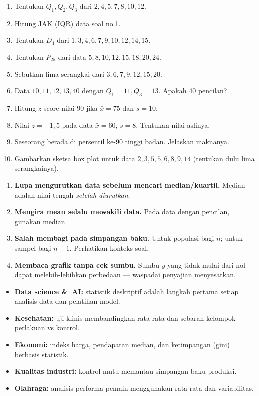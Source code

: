 \documentclass[11pt,a4paper]{report}
\theoremstyle{gaya}
\begin{document}
\begin{latihan}
\begin{enumerate}[leftmargin=*]
  \item Tentukan $Q_1,Q_2,Q_3$ dari $2,4,5,7,8,10,12$.
  \item Hitung JAK (IQR) data soal no.1.
  \item Tentukan $D_4$ dari $1,3,4,6,7,9,10,12,14,15$.
  \item Tentukan $P_{25}$ dari data $5,8,10,12,15,18,20,24$.
  \item Sebutkan lima serangkai dari $3,6,7,9,12,15,20$.
  \item Data $10,11,12,13,40$ dengan $Q_1=11,Q_3=13$. Apakah $40$ pencilan?
  \item Hitung $z$-score nilai $90$ jika $\bar x=75$ dan $s=10$.
  \item Nilai $z=-1{,}5$ pada data $\bar x=60$, $s=8$. Tentukan nilai aslinya.
  \item Seseorang berada di persentil ke-$90$ tinggi badan. Jelaskan maknanya.
  \item Gambarkan sketsa box plot untuk data $2,3,5,5,6,8,9,14$ (tentukan dulu lima serangkainya).
\end{enumerate}
\end{latihan}

\begin{kesalahan}
\begin{enumerate}[leftmargin=*,topsep=2pt]
  \item \textbf{Lupa mengurutkan data sebelum mencari median/kuartil.} Median adalah nilai tengah \emph{setelah diurutkan}.
  \item \textbf{Mengira mean selalu mewakili data.} Pada data dengan pencilan, gunakan median.
  \item \textbf{Salah membagi pada simpangan baku.} Untuk populasi bagi $n$; untuk sampel bagi $n-1$. Perhatikan konteks soal.
  \item \textbf{Membaca grafik tanpa cek sumbu.} Sumbu-$y$ yang tidak mulai dari nol dapat melebih-lebihkan perbedaan --- waspadai penyajian menyesatkan.
\end{enumerate}
\end{kesalahan}

\begin{dunianyata}
\begin{itemize}[leftmargin=*,topsep=2pt]
  \item \textbf{Data science \&\ AI:} statistik deskriptif adalah langkah pertama setiap analisis data dan pelatihan model.
  \item \textbf{Kesehatan:} uji klinis membandingkan rata-rata dan sebaran kelompok perlakuan vs kontrol.
  \item \textbf{Ekonomi:} indeks harga, pendapatan median, dan ketimpangan (gini) berbasis statistik.
  \item \textbf{Kualitas industri:} kontrol mutu memantau simpangan baku produksi.
  \item \textbf{Olahraga:} analisis performa pemain menggunakan rata-rata dan variabilitas.
\end{itemize}
\end{dunianyata}
\end{document}

